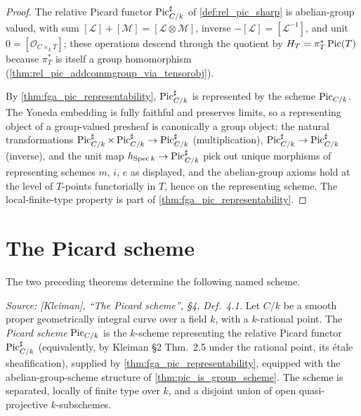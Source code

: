 \begin{proof}
\leanok
  The relative Picard functor \(\operatorname{Pic}^\sharp_{C/k}\) of
  \cref{def:rel_pic_sharp} is abelian-group valued, with sum
  \([\mathcal{L}] + [\mathcal{M}] = [\mathcal{L} \otimes \mathcal{M}]\),
  inverse \(-[\mathcal{L}] = [\mathcal{L}^{-1}]\), and unit
  \(0 = [\mathcal{O}_{C \times_k T}]\); these operations descend through
  the quotient by \(H_T = \pi_T^*\operatorname{Pic}(T)\) because \(\pi_T^*\) is itself a
  group homomorphism (\cref{thm:rel_pic_addcommgroup_via_tensorobj}).

  By \cref{thm:fga_pic_representability}, \(\operatorname{Pic}^\sharp_{C/k}\) is
  represented by the scheme \(\operatorname{Pic}_{C/k}\). The Yoneda embedding is fully
  faithful and preserves limits, so a representing object of a
  group-valued presheaf is canonically a group object: the natural
  transformations
  $\operatorname{Pic}^\sharp_{C/k} \times \operatorname{Pic}^\sharp_{C/k} \to \operatorname{Pic}^\sharp_{C/k}$
  (multiplication), \(\operatorname{Pic}^\sharp_{C/k} \to \operatorname{Pic}^\sharp_{C/k}\) (inverse),
  and the unit map \(h_{\operatorname{Spec} k} \to \operatorname{Pic}^\sharp_{C/k}\) pick out unique
  morphisms of representing schemes \(m\), \(i\), \(e\) as displayed, and
  the abelian-group axioms hold at the level of \(T\)-points functorially
  in \(T\), hence on the representing scheme. The local-finite-type
  property is part of \cref{thm:fga_pic_representability}.
\end{proof}

\section{The Picard scheme}
\label{sec:fga_pic_named_definition}

The two preceding theorems determine the following named scheme.

\begin{definition}\leanok
  \label{def:pic_scheme}

  \textit{Source: [Kleiman], ``The Picard scheme'', \S 4, Def.~4.1.}
  Let \(C/k\) be a smooth proper geometrically integral curve over a field
  \(k\), with a \(k\)-rational point. The \emph{Picard scheme} \(\operatorname{Pic}_{C/k}\)
  is the \(k\)-scheme representing the relative Picard functor
  \(\operatorname{Pic}^\sharp_{C/k}\) (equivalently, by Kleiman \S 2 Thm.~2.5 under the
  rational point, its \'etale sheafification), supplied by
  \cref{thm:fga_pic_representability}, equipped with the abelian-group-scheme
  structure of \cref{thm:pic_is_group_scheme}. The scheme is separated,
  locally of finite type over \(k\), and a disjoint union of open
  quasi-projective \(k\)-subschemes.
\end{definition}

